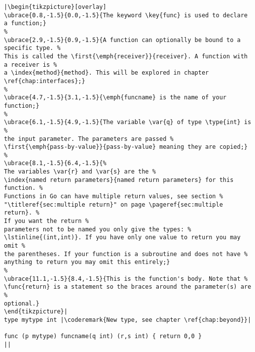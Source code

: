 \begin{lstlisting}[caption=A function declaration,label=src:function definition]
|\begin{tikzpicture}[overlay]
\ubrace{0.8,-1.5}{0.0,-1.5}{The keyword \key{func} is used to declare a function;}
%
\ubrace{2.9,-1.5}{0.9,-1.5}{A function can optionally be bound to a specific type. %
This is called the \first{\emph{receiver}}{receiver}. A function with a receiver is %
a \index{method}{method}. This will be explored in chapter \ref{chap:interfaces};}
%
\ubrace{4.7,-1.5}{3.1,-1.5}{\emph{funcname} is the name of your function;}
%
\ubrace{6.1,-1.5}{4.9,-1.5}{The variable \var{q} of type \type{int} is %
the input parameter. The parameters are passed %
\first{\emph{pass-by-value}}{pass-by-value} meaning they are copied;}
%
\ubrace{8.1,-1.5}{6.4,-1.5}{%
The variables \var{r} and \var{s} are the %
\index{named return parameters}{named return parameters} for this function. %
Functions in Go can have multiple return values, see section %
"\titleref{sec:multiple return}" on page \pageref{sec:multiple return}. %
If you want the return %
parameters not to be named you only give the types: %
\lstinline{(int,int)}. If you have only one value to return you may omit %
the parentheses. If your function is a subroutine and does not have %
anything to return you may omit this entirely;}
%
\ubrace{11.1,-1.5}{8.4,-1.5}{This is the function's body. Note that %
\func{return} is a statement so the braces around the parameter(s) are %
optional.}
\end{tikzpicture}|
type mytype int	|\coderemark{New type, see chapter \ref{chap:beyond}}|

func (p mytype) funcname(q int) (r,s int) { return 0,0 }
||
\end{lstlisting}
